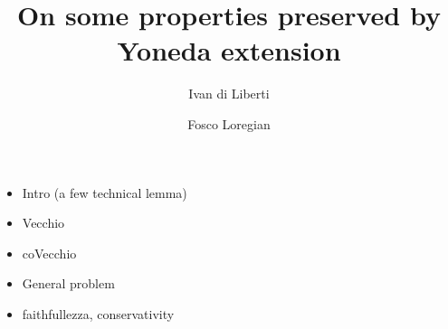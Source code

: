 \documentclass[a4paper,10pt]{amsart}
\author{Ivan di Liberti \and Fosco Loregian}
\title{On some properties preserved by Yoneda extension}
\begin{document}
\maketitle
\begin{abstract}

\end{abstract}
\begin{itemize}
	\item Intro (a few technical lemma)
	\item Vecchio \cite{adamek2002classification}
	\item coVecchio
	\item General problem
	\item faithfullezza, conservativity
\end{itemize}

{}

\hrulefill 
\end{document}
